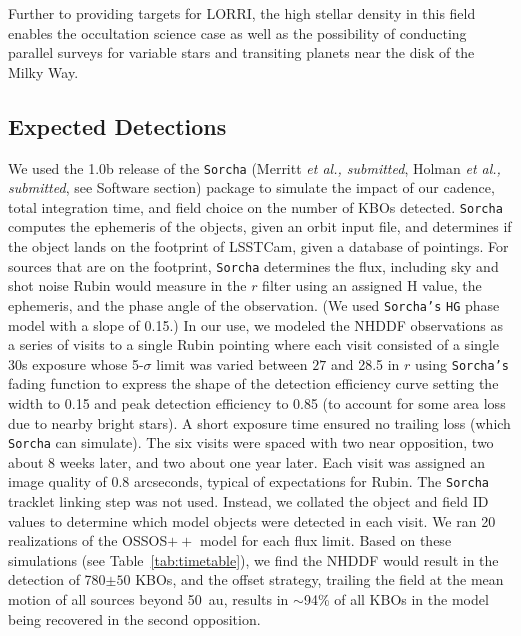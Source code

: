\documentclass[modern,linenumbers,trackchanges,preprint]{aastex631}
\begin{document}
Further to providing targets for LORRI, the high stellar density in this field enables the occultation science case as well as the possibility of conducting parallel surveys for variable stars and transiting planets near the disk of the Milky Way.  

\subsection{Expected Detections}
We used the 1.0b release of the \texttt{Sorcha} (Merritt {\it et al., submitted}, Holman {\it et al., submitted}, see Software section) package to simulate the impact of our cadence, total integration time, and field choice on the number of KBOs detected. 
\texttt{Sorcha} computes the ephemeris of the objects, given an orbit input file, and determines if the object lands on the footprint of LSSTCam, given a database of pointings.  
For sources that are on the footprint, \texttt{Sorcha} determines the flux, including sky and shot noise Rubin would measure in the $r$ filter using an assigned H value, the ephemeris, and the phase angle of the observation. 
(We used \texttt{Sorcha's} \texttt{HG} phase model with a slope of 0.15.)
In our use, we modeled the NHDDF observations as a series of visits to a single Rubin pointing where each visit consisted of a single 30s exposure whose 5-$\sigma$ limit was varied between $27$ and 28.5 in $r$ using \texttt{Sorcha's} fading function to express the shape of the detection efficiency curve setting the width to 0.15 and peak detection efficiency to 0.85 (to account for some area loss due to nearby bright stars).  
A short exposure time ensured no trailing loss (which \texttt{Sorcha} can simulate).  
The six visits were spaced with two near opposition, two about 8 weeks later, and two about one year later. 
Each visit was assigned an image quality of 0.8 arcseconds, typical of expectations for Rubin.
The \texttt{Sorcha} tracklet linking step was not used. Instead, we collated the object and field ID values to determine which model objects were detected in each visit. 
We ran 20 realizations of the OSSOS$++$ model for each flux limit.
Based on these simulations (see Table~\ref{tab:timetable}), we find the NHDDF would result in the detection of 780$\pm{50}$ KBOs, and the offset strategy, trailing the field at the mean motion of all sources beyond 50~au, results in $\sim$94\% of all KBOs in the model being recovered in the second opposition.
\end{document}
